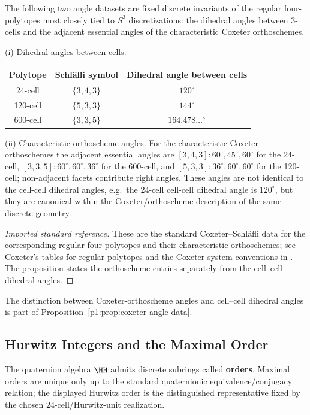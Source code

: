 \documentclass[11pt]{article}
\begin{document}
\begin{proposition}
\label{p1:prop:coxeter-angle-data}
The following two angle datasets are fixed discrete invariants of the regular
four-polytopes most closely tied to $S^3$ discretizations: the dihedral angles between 3-cells and the adjacent essential angles of the characteristic Coxeter orthoschemes.

\smallskip
\noindent\textup{(i) Dihedral angles between cells.}
\begin{center}
\begin{tabular}{|c|c|c|}
\hline
Polytope & Schl\"afli symbol & Dihedral angle between cells \\
\hline
24-cell & $\{3,4,3\}$ & $120^\circ$ \\
120-cell & $\{5,3,3\}$ & $144^\circ$ \\
600-cell & $\{3,3,5\}$ & $164.478\ldots^\circ$ \\
\hline
\end{tabular}
\end{center}

\smallskip
\noindent\textup{(ii) Characteristic orthoscheme angles.}
For the characteristic Coxeter orthoschemes the adjacent essential angles are
$[3,4,3]:60^\circ,45^\circ,60^\circ$ for the 24-cell,
$[3,3,5]:60^\circ,60^\circ,36^\circ$ for the 600-cell, and
$[5,3,3]:36^\circ,60^\circ,60^\circ$ for the 120-cell; non-adjacent facets contribute right angles. These angles are not identical to the cell-cell dihedral angles, e.g.\ the 24-cell cell-cell dihedral angle is $120^\circ$, but they are canonical within the Coxeter/orthoscheme description of the same discrete geometry.
\end{proposition}

\begin{proof}[Imported standard reference]
These are the standard Coxeter--Schl\"afli data for the corresponding regular four-polytopes and their characteristic orthoschemes; see Coxeter's tables for regular polytopes and the Coxeter-system conventions in \cite{coxeter1973regular,Humphreys1990}.  The proposition states the orthoscheme entries separately from the cell--cell dihedral angles.
\end{proof}



The distinction between Coxeter-orthoscheme angles and cell--cell dihedral
angles is part of Proposition~\ref{p1:prop:coxeter-angle-data}.


\subsection{Hurwitz Integers and the Maximal Order}
\label{p1:sec:hurwitz}
\label{p1:subsec:hurwitz-integers-maximal-order}
The quaternion algebra $\HH$ admits discrete subrings called \textbf{orders}.  Maximal orders are unique only up to the standard quaternionic equivalence/conjugacy relation; the displayed Hurwitz order is the distinguished representative fixed by the chosen \(24\)-cell/Hurwitz-unit realization.
\end{document}
